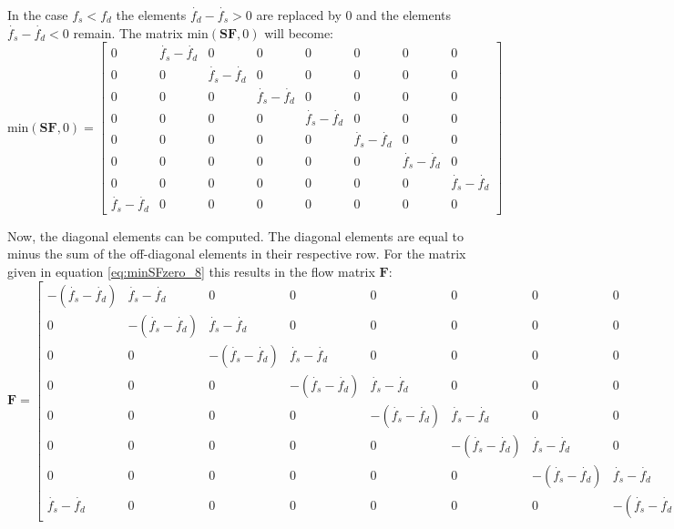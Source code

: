 \begin{scriptsize}
	In the case $f_s < f_d$ the elements $\dot{f_d}-\dot{f_s} > 0 $ are replaced by 0 and the elements $\dot{f_s}-\dot{f_d} < 0 $ remain. The matrix $\text{min}(\mathbf{SF},0)$ will become:
	\begin{equation}
		\text{min}(\mathbf{SF},0) = 
		\begin{bmatrix}
			0 & \dot{f_s}-\dot{f_d} & 0 & 0 & 0 & 0 & 0 & 0 \\
			0 & 0 & \dot{f_s}-\dot{f_d} & 0 & 0 & 0 & 0 & 0 \\
			0 & 0 & 0 & \dot{f_s}-\dot{f_d} & 0 & 0 & 0 & 0 \\
			0 & 0 & 0 & 0 & \dot{f_s}-\dot{f_d} & 0 & 0 & 0 \\
			0 & 0 & 0 & 0 & 0 & \dot{f_s}-\dot{f_d} & 0 & 0 \\
			0 & 0 & 0 & 0 & 0 & 0 & \dot{f_s}-\dot{f_d} & 0 \\
			0 & 0 & 0 & 0 & 0 & 0 & 0 & \dot{f_s}-\dot{f_d} \\
			\dot{f_s}-\dot{f_d} & 0 & 0 & 0 & 0 & 0 & 0 & 0
		\end{bmatrix}
		\label{eq:minSFzero_8}
	\end{equation}
	
	Now, the diagonal elements can be computed. The diagonal elements are equal to minus the sum of the off-diagonal elements in their respective row. For the matrix given in equation \ref{eq:minSFzero_8} this results in the flow matrix $\mathbf{F}$:
	\begin{equation}
		\mathbf{F} =  
		\begin{bmatrix}
			-(\dot{f_s}-\dot{f_d}) & \dot{f_s}-\dot{f_d} & 0 & 0 & 0 & 0 & 0 & 0 \\
			0 & -(\dot{f_s}-\dot{f_d}) & \dot{f_s}-\dot{f_d} & 0 & 0 & 0 & 0 & 0 \\
			0 & 0 & -(\dot{f_s}-\dot{f_d}) & \dot{f_s}-\dot{f_d} & 0 & 0 & 0 & 0 \\
			0 & 0 & 0 & -(\dot{f_s}-\dot{f_d}) & \dot{f_s}-\dot{f_d} & 0 & 0 & 0 \\
			0 & 0 & 0 & 0 & -(\dot{f_s}-\dot{f_d}) & \dot{f_s}-\dot{f_d} & 0 & 0 \\
			0 & 0 & 0 & 0 & 0 & -(\dot{f_s}-\dot{f_d}) & \dot{f_s}-\dot{f_d} & 0 \\
			0 & 0 & 0 & 0 & 0 & 0 & -(\dot{f_s}-\dot{f_d}) & \dot{f_s}-\dot{f_d} \\
			\dot{f_s}-\dot{f_d} & 0 & 0 & 0 & 0 & 0 & 0 & -(\dot{f_s}-\dot{f_d})
		\end{bmatrix}
		\label{eq:flowmatrix}
	\end{equation}
	

\end{scriptsize}
